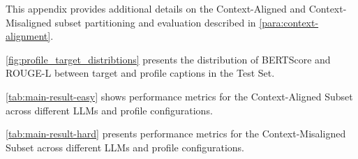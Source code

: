 This appendix provides additional details on the Context-Aligned and Context-Misaligned subset partitioning and evaluation described in \autoref{para:context-alignment}.

\autoref{fig:profile_target_distribtions} presents the distribution of BERTScore and ROUGE-L between target and profile captions in the \textbf{\dataset} Test Set.


\autoref{tab:main-result-easy} shows performance metrics for the Context-Aligned Subset across different LLMs and profile configurations.


\autoref{tab:main-result-hard} presents performance metrics for the Context-Misaligned Subset across different LLMs and profile configurations.

